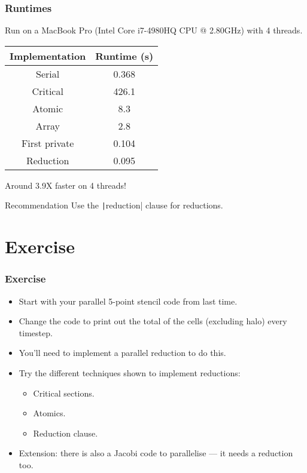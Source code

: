 \documentclass{beamer}
\begin{document}
\begin{frame}
\frametitle{Runtimes}
Run on a MacBook Pro (Intel Core i7-4980HQ CPU @ 2.80GHz) with 4 threads.

\vfill

\begin{table}
\begin{tabular}{cc}
\toprule
Implementation & Runtime (s) \\
\midrule
Serial        & 0.368 \\
Critical      & 426.1 \\
Atomic        & 8.3 \\
Array         & 2.8 \\
First private & 0.104 \\
Reduction     & 0.095 \\
\bottomrule
\end{tabular}
\end{table}

\vfill

Around 3.9X faster on 4 threads!

\vfill


\begin{block}{Recommendation}
Use the \texttt|reduction| clause for reductions.
\end{block}

\end{frame}

\section{Exercise}
\begin{frame}
\frametitle{Exercise}
\begin{itemize}
  \item Start with your parallel 5-point stencil code from last time.
  \item Change the code to print out the total of the cells (excluding halo) every timestep.
  \item You'll need to implement a parallel reduction to do this.
  \item Try the different techniques shown to implement reductions:
    \begin{itemize}
      \item Critical sections.
      \item Atomics.
      \item Reduction clause.
    \end{itemize}
  \item Extension: there is also a Jacobi code to parallelise --- it needs a reduction too.
\end{itemize}
\end{frame}
\end{document}
